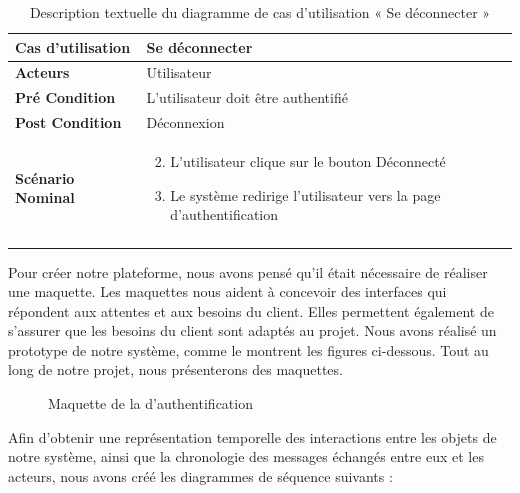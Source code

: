 \begin{longtable}{|p{5cm}|p{10cm}|}
\hline
\textbf{Cas d'utilisation}&Se déconnecter\\
\hline
\textbf{Acteurs}&Utilisateur \\
\hline
\textbf{Pré Condition}&L'utilisateur doit être authentifié\\
\hline
\textbf{Post Condition}&Déconnexion\\
\hline
\textbf{Scénario Nominal}&
\vspace{-\baselineskip}
\begin{enumerate}
    \setcounter{enumi}{1}
    \item L'utilisateur clique sur le bouton Déconnecté
    \item Le système redirige l'utilisateur vers la page d'authentification

\end{enumerate}\\
\hline
\caption{Description textuelle du diagramme de cas d'utilisation « Se déconnecter »}
\label{tab:use_case_logout}
\end{longtable}

Pour créer notre plateforme, nous avons pensé qu'il était nécessaire de réaliser une maquette. Les maquettes nous aident à concevoir des interfaces qui répondent aux attentes et aux besoins du client. Elles permettent également de s'assurer que les besoins du client sont adaptés au projet. Nous avons réalisé un prototype de notre système, comme le montrent les figures ci-dessous. Tout au long de notre projet, nous présenterons des maquettes.

\begin{figure}[H]
  \centering
  \caption{Maquette de la d'authentification}
  \label{fig:design_auth}
\end{figure}


Afin d'obtenir une représentation temporelle des interactions entre les objets de notre système, ainsi que la chronologie des messages échangés entre eux et les acteurs, nous avons créé les diagrammes de séquence suivants :

